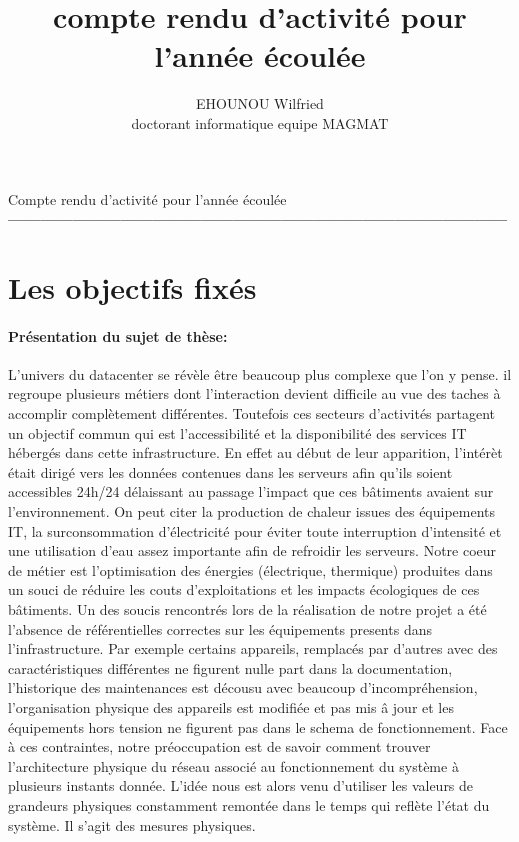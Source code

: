 \documentclass [a4paper,10pt]{article}
\title{ compte rendu d'activit\'e pour l'ann\'ee \'ecoul\'ee}
\author{EHOUNOU Wilfried\\ doctorant informatique equipe MAGMAT }
\begin{document}
	{\LARGE  Compte rendu d'activit\'e pour l'ann\'ee \'ecoul\'ee} \\
{ \bf ---------------------------------------------------------------------------------------------}
	\section{Les objectifs fix\'es}
		\paragraph{Pr\'esentation du sujet de th\`ese: }
		
L'univers du datacenter se r\'ev\`ele \^etre beaucoup plus complexe que l'on y pense. il regroupe plusieurs m\'etiers dont l'interaction devient difficile au vue des taches \`a accomplir compl\`etement diff\'erentes. Toutefois ces secteurs d'activit\'es partagent un objectif commun qui est l'accessibilit\'e et la disponibilit\'e des services IT h\'eberg\'es dans cette infrastructure. En effet au d\'ebut de leur apparition, l'int\'er\`et \'etait dirig\'e vers les donn\'ees contenues dans les serveurs afin qu'ils soient accessibles 24h/24 d\'elaissant au passage l'impact que ces b\^atiments avaient sur l'environnement. On peut citer la production de chaleur issues des \'equipements IT, la surconsommation d'\'electricit\'e pour \'eviter toute interruption d'intensit\'e et une utilisation d'eau assez importante afin de refroidir les serveurs.\newline
Notre coeur de m\'etier est l'optimisation des \'energies (\'electrique, thermique) produites dans un souci de r\'eduire les couts d'exploitations et les impacts \'ecologiques de ces b\^atiments. Un des soucis rencontr\'es lors de la r\'ealisation de notre projet a \'et\'e l'absence de r\'ef\'erentielles correctes sur les \'equipements presents dans l'infrastructure. Par exemple certains appareils, remplac\'es par d'autres avec des caract\'eristiques diff\'erentes ne figurent nulle part dans la documentation, l'historique des maintenances est d\'ecousu avec beaucoup d'incompr\'ehension, l'organisation physique des appareils est modifi\'ee et pas mis \^a jour et les \'equipements hors tension ne figurent pas dans le schema de fonctionnement.\newline
 Face \`a ces contraintes, notre pr\'eoccupation est de savoir comment trouver l'architecture physique du r\'eseau associ\'e au fonctionnement du syst\`eme \`a plusieurs instants donn\'ee. 
 L'id\'ee nous est alors venu d'utiliser les valeurs de grandeurs physiques constamment remont\'ee dans le temps qui refl\`ete l'\'etat du syst\`eme. Il s'agit des mesures physiques. 
\end{document}
